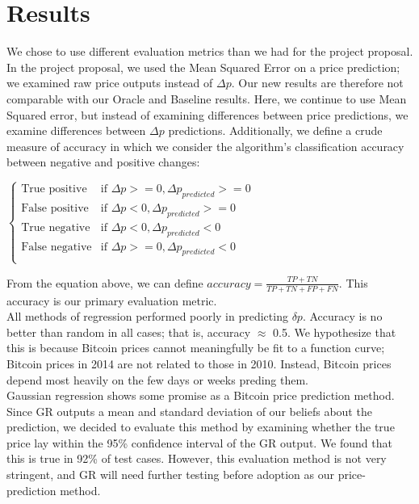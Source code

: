 \documentclass[10pt]{article}
\begin{document}
\section*{ Results}
 We chose to use different evaluation metrics than we had for the project proposal. In the project proposal, we used the Mean Squared Error on a price prediction; we examined raw price outputs instead of $\Delta p$. Our new results are therefore not comparable with our Oracle and Baseline results.
 	Here, we continue to use Mean Squared error, but instead of examining differences between price predictions, we examine differences between $\Delta p$ predictions. Additionally, we define a crude measure of accuracy in which we consider the algorithm’s classification accuracy between negative and positive changes: 
 	
$ 	 \begin{cases} \text{True positive} &\mbox{if } \Delta p >= 0, \Delta p_{predicted} >= 0 \\ 
\text{False positive} &\mbox{if } \Delta p < 0, \Delta p_{predicted} >= 0 \\ 
\text{True negative} &\mbox{if } \Delta p < 0, \Delta p_{predicted} < 0 \\ 
\text{False negative} &\mbox{if } \Delta p >= 0, \Delta p_{predicted} < 0 \\ 
 	 \end{cases}$ 
 	
 	
 	From the equation above, we can define $accuracy = \frac{TP + TN}{TP + TN + FP + FN}$. This accuracy is our primary evaluation metric. \\
 	
 	All methods of regression performed poorly in predicting $\delta p$.  Accuracy is no better than random in all cases; that is, accuracy $\approx$ 0.5. We hypothesize that this is because Bitcoin prices cannot meaningfully be fit to a function curve; Bitcoin prices in 2014 are not related to those in 2010. Instead, Bitcoin prices depend most heavily on the few days or weeks preding them. \\
 	
 	Gaussian regression shows some promise as a Bitcoin price prediction method. Since GR outputs a mean and standard deviation of our beliefs about the prediction, we decided to evaluate this method by examining whether the true price lay within the 95\% confidence interval of the GR output. We found that this is true in 92\% of test cases. However, this evaluation method is not very stringent, and GR will need further testing before adoption as our price-prediction method. \\
 	
\end{document}
